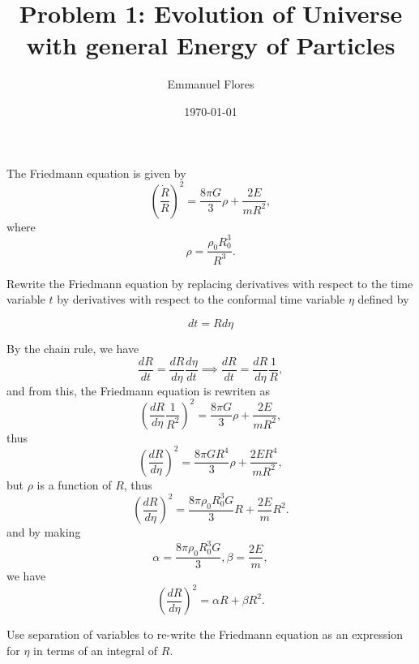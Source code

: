\documentclass[11pt]{article}
\title{Problem 1: Evolution of Universe with general Energy of Particles}
\author{Emmanuel Flores}
\date{\today}
\begin{document}
\maketitle
The Friedmann equation is given by 
\begin{displaymath}
  \left( \frac{\dot{R}}{R}\right)^2 = \frac{8\pi G}{3}\rho +\frac{2E}{mR^2},
\end{displaymath}
where \begin{displaymath}
  \rho = \frac{\rho_0 R_0^3}{R^3}.
\end{displaymath}
\begin{problem}
	Rewrite the Friedmann equation by replacing derivatives with respect to the time variable $t$ by derivatives with respect to the conformal time variable $\eta$ defined by
\end{problem} 
\begin{displaymath}
  dt = Rd\eta
\end{displaymath}

\begin{solution}
By the chain rule, we have
\begin{displaymath}
  \frac{dR}{dt} = \frac{dR}{d\eta}\frac{d\eta}{dt}\implies \frac{dR}{dt} = \frac{dR}{d\eta}\frac{1}{R},
\end{displaymath}
and from this, the Friedmann equation is rewriten as
\begin{displaymath}
  \left( \frac{dR}{d\eta}\frac{1}{R^2}\right)^2 = \frac{8\pi G}{3}\rho +\frac{2E}{mR^2},
\end{displaymath}
thus
\begin{displaymath}
  \left( \frac{dR}{d\eta}\right)^2 = \frac{8\pi GR^4}{3}\rho +\frac{2ER^4}{mR^2},
\end{displaymath}
but $\rho$ is a function of $R$, thus
\begin{displaymath}
  \left( \frac{dR}{d\eta}\right)^2 = \frac{8\pi \rho_0 R_0^3G}{3}R +\frac{2E}{m}R^2.
\end{displaymath}
and by making
\begin{displaymath}
  \alpha = \frac{8\pi \rho_0 R_0^3G}{3}, \beta = \frac{2E}{m},
\end{displaymath}
we have
\begin{displaymath}
  \left(\frac{dR}{d\eta}\right )^2 = \alpha R+\beta R^2.
\end{displaymath}
\end{solution}

\pagebreak
\begin{problem}
Use separation of variables to re-write the Friedmann equation as an expression for $\eta$ in terms of an integral of $R$.
\end{problem}
\end{document}
